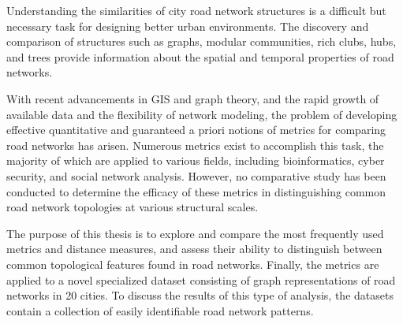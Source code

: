 
Understanding the similarities of city road network structures is a difficult but necessary task for designing better urban environments. The discovery and comparison of structures such as graphs, modular communities, rich clubs, hubs, and trees provide information about the spatial and temporal properties of road networks.

With recent advancements in GIS and graph theory, and the rapid growth of available data and the flexibility of network modeling, the problem of developing effective quantitative and guaranteed a priori notions of metrics for comparing road networks has arisen. Numerous metrics exist to accomplish this task, the majority of which are applied to various fields, including bioinformatics, cyber security, and social network analysis. However, no comparative study has been conducted to determine the efficacy of these metrics in distinguishing common road network topologies at various structural scales.

The purpose of this thesis is to explore and compare the most frequently used metrics and distance measures, and assess their ability to distinguish between common topological features found in road networks. Finally, the metrics are applied to a novel specialized dataset consisting of graph representations of road networks in 20 cities. To discuss the results of this type of analysis, the datasets contain a collection of easily identifiable road network patterns.